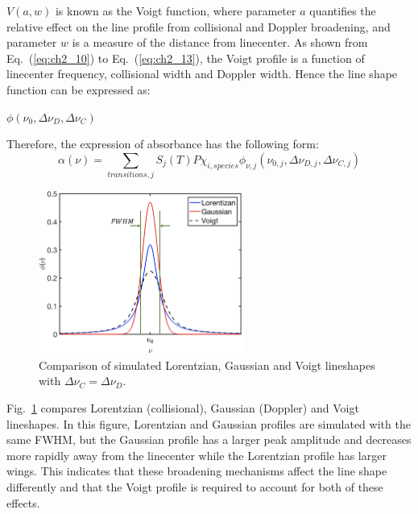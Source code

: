\vspace{3mm}

\noindent $V(a,w)$ is known as the Voigt function, where parameter $a$ quantifies the relative effect on the line profile from collisional and Doppler broadening, and parameter $w$ is a measure of the distance from linecenter. As shown from Eq.\ (\ref{eq:ch2_10}) to Eq.\ (\ref{eq:ch2_13}), the Voigt profile is a function of linecenter frequency, collisional width and Doppler width. Hence the line shape function can be expressed as:

\begin{center}
$\phi(\nu_{0},\Delta\nu_D,\Delta\nu_C)$
\end{center}

Therefore, the expression of absorbance has the following form:
\begin{equation}\label{}
\alpha(\nu)=\sum_{transitions, j}S_j(T)P\chi_{i,species}\phi_{\nu,j}(\nu_{0,j},\Delta\nu_{D,j},\Delta\nu_{C,j})
\end{equation}

\begin{figure}[b]
    \centering
        \includegraphics[width=0.6\textwidth]{fig/ch2_fig4.png}
        \caption{Comparison of simulated Lorentzian, Gaussian and Voigt lineshapes with $\Delta\nu_C=\Delta\nu_D$.}
    \label{fig:ch2_3}
\end{figure}

Fig.\ \ref{fig:ch2_3} compares Lorentzian (collisional), Gaussian (Doppler) and Voigt lineshapes. In this figure, Lorentzian and Gaussian profiles are simulated with the same FWHM, but the Gaussian profile has a larger peak amplitude and decreases more rapidly away from the linecenter while the Lorentzian profile has larger wings. This indicates that these broadening mechanisms affect the line shape differently and that the Voigt profile is required to account for both of these effects.

